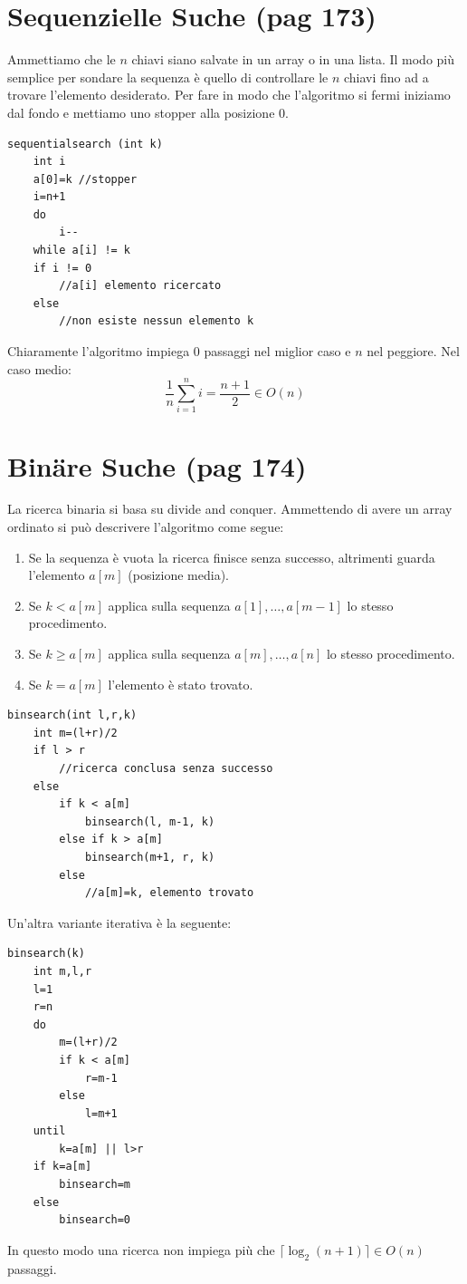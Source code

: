 \documentclass[a4paper]{book}
\newcommand{\lstIndent}{4}
\begin{document}
\section{Sequenzielle Suche (pag 173)}
Ammettiamo che le $n$ chiavi siano salvate in un array o in una lista. Il modo più semplice per sondare la sequenza è quello di controllare le $n$ chiavi fino ad a trovare l'elemento desiderato. Per fare in modo che l'algoritmo si fermi iniziamo dal fondo e mettiamo uno stopper alla posizione 0.
\begin{lstlisting}[tabsize=\lstIndent]
sequentialsearch (int k)
	int i
	a[0]=k //stopper
	i=n+1
	do
		i--
	while a[i] != k
	if i != 0
		//a[i] elemento ricercato
	else
		//non esiste nessun elemento k		
\end{lstlisting} 
Chiaramente l'algoritmo impiega 0 passaggi nel miglior caso e $n$ nel peggiore. Nel caso medio:
$$ \frac{1}{n} \sum_{i=1}^n i = \frac{n+1}{2} \in O(n) $$
\section{Binäre Suche (pag 174)}
La ricerca binaria si basa su divide and conquer. Ammettendo di avere un array ordinato si può descrivere l'algoritmo come segue:
\begin{enumerate}
\item Se la sequenza è vuota la ricerca finisce senza successo, altrimenti guarda l'elemento $a[m]$ (posizione media).
\item Se $k < a[m]$ applica sulla sequenza $a[1],\dots, a[m-1]$ lo stesso procedimento.
\item Se $k \geq a[m]$ applica sulla sequenza $a[m],\dots, a[n]$ lo stesso procedimento.
\item Se $k = a[m]$ l'elemento è stato trovato.
\end{enumerate}
\begin{lstlisting}[tabsize=\lstIndent]
binsearch(int l,r,k)
	int m=(l+r)/2
	if l > r
		//ricerca conclusa senza successo
	else
		if k < a[m]
			binsearch(l, m-1, k)
		else if k > a[m]
			binsearch(m+1, r, k)	
		else
			//a[m]=k, elemento trovato				
\end{lstlisting}
Un'altra variante iterativa è la seguente:
\begin{lstlisting}[tabsize=\lstIndent]
binsearch(k)
	int m,l,r
	l=1
	r=n
	do
		m=(l+r)/2
		if k < a[m]
			r=m-1
		else
			l=m+1
	until
		k=a[m] || l>r
	if k=a[m]
		binsearch=m
	else
		binsearch=0								
\end{lstlisting}
In questo modo una ricerca non impiega più che $\lceil \log_2(n+1) \rceil \in O(n) $ passaggi.
\end{document}

